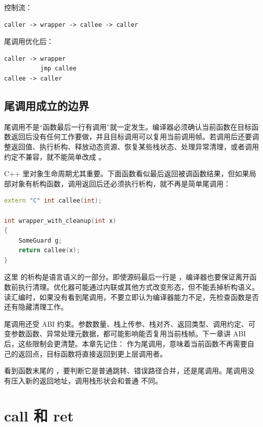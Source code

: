 控制流：

\begin{lstlisting}
caller -> wrapper -> callee -> caller
\end{lstlisting}

尾调用优化后：

\begin{lstlisting}
caller -> wrapper
          jmp callee
callee -> caller
\end{lstlisting}

\subsection{尾调用成立的边界}

尾调用不是“函数最后一行有调用”就一定发生。编译器必须确认当前函数在目标函数返回后没有任何工作要做，并且目标调用可以复用当前调用帧。若调用后还要调整返回值、执行析构、释放动态资源、恢复某些栈状态、处理异常清理，或者调用约定不兼容，就不能简单改成 。

C++ 里对象生命周期尤其重要。下面函数看似最后返回被调函数结果，但如果局部对象有析构函数，调用返回后还必须执行析构，就不再是简单尾调用：

\begin{lstlisting}[language=C++]
extern "C" int callee(int);

int wrapper_with_cleanup(int x)
{
    SomeGuard g;
    return callee(x);
}
\end{lstlisting}

这里  的析构是语言语义的一部分。即使源码最后一行是 ，编译器也要保证离开函数前执行清理。优化器可能通过内联或其他方式改变形态，但不能丢掉析构语义。读汇编时，如果没有看到尾调用，不要立即认为编译器能力不足，先检查函数是否还有隐藏清理工作。

尾调用还受 ABI 约束。参数数量、栈上传参、栈对齐、返回类型、调用约定、可变参数函数、异常处理元数据，都可能影响能否复用当前栈帧。下一章讲 ABI 后，这些限制会更清楚。本章先记住： 作为尾调用，意味着当前函数不再需要自己的返回点，目标函数将直接返回到更上层调用者。

\begin{warningbox}
看到函数末尾的 ，要判断它是普通跳转、错误路径合并，还是尾调用。尾调用没有压入新的返回地址，调用栈形状会和普通  不同。
\end{warningbox}

\section{call 和 ret}

